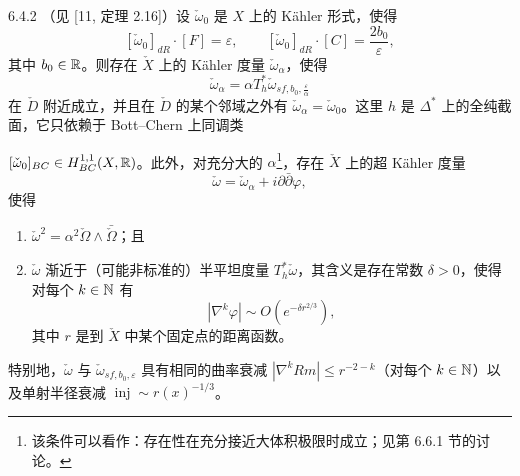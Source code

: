 \begin{theorem}{6.4.2}
（见 [11, 定理 2.16]）设 $\check\omega_0$ 是 $X$ 上的 Kähler 形式，使得
\[
[\check\omega_0]_{dR}\cdot[F]=\varepsilon,\qquad [\check\omega_0]_{dR}\cdot[C]=\frac{2b_0}{\varepsilon},
\]
其中 $b_0\in\mathbb{R}$。则存在 $\check X$ 上的 Kähler 度量 $\check\omega_\alpha$，使得
\[
\check\omega_\alpha=\alpha T_h^*\check\omega_{sf,b_0,\frac{\varepsilon}{\alpha}}
\]
在 $\check D$ 附近成立，并且在 $\check D$ 的某个邻域之外有 $\check\omega_\alpha=\check\omega_0$。这里 $h$ 是 $\Delta^*$ 上的全纯截面，它只依赖于 Bott--Chern 上同调类

$[\check\omega_0]_{BC}\in H^{1,1}_{BC}(X,\mathbb{R})$。此外，对充分大的 $\alpha$\footnote{该条件可以看作：存在性在充分接近大体积极限时成立；见第 6.6.1 节的讨论。}，存在 $\check X$ 上的超 Kähler 度量
\[
\check\omega=\check\omega_\alpha+i\partial\bar\partial\varphi,
\]
使得
\begin{enumerate}
\item[(1)] $\check\omega^2=\alpha^2\check\Omega\wedge\bar{\check\Omega}$；且
\item[(2)] $\check\omega$ 渐近于（可能非标准的）半平坦度量 $T_h^*\check\omega$，其含义是存在常数 $\delta>0$，使得对每个 $k\in\mathbb{N}$ 有
\[
|\nabla^k\varphi|\sim O(e^{-\delta r^{2/3}}),
\]
其中 $r$ 是到 $\check X$ 中某个固定点的距离函数。
\end{enumerate}
\end{theorem}

特别地，$\check\omega$ 与 $\check\omega_{sf,b_0,\varepsilon}$ 具有相同的曲率衰减 $|\nabla^k Rm|\le r^{-2-k}$（对每个 $k\in\mathbb{N}$）以及单射半径衰减 $\operatorname{inj}\sim r(x)^{-1/3}$。

